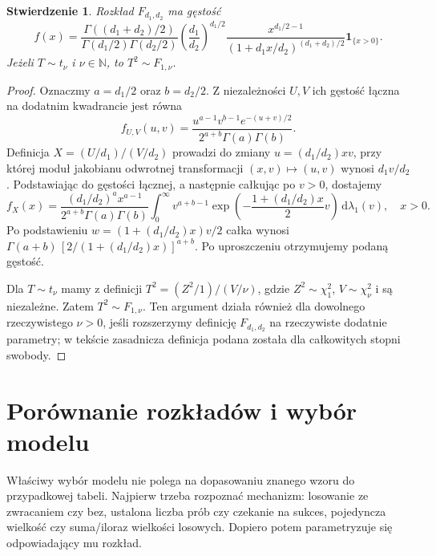 \documentclass[11pt,a4paper,oneside]{report}
\numberwithin{equation}{chapter}
\theoremstyle{plain}
\newtheorem{stwierdzenie}[twierdzenie]{Stwierdzenie}
\theoremstyle{definition}
\theoremstyle{remark}
\newcommand{\N}{\mathbb{N}}
\newcommand{\ind}[1]{\mathbf{1}_{#1}}
\newcommand{\dd}{\mathrm{d}}
\begin{document}
\begin{stwierdzenie}
Rozkład $F_{d_1,d_2}$ ma gęstość
\[
f(x)=\frac{\Gamma((d_1+d_2)/2)}
{\Gamma(d_1/2)\Gamma(d_2/2)}
\left(\frac{d_1}{d_2}\right)^{d_1/2}
\frac{x^{d_1/2-1}}{(1+d_1x/d_2)^{(d_1+d_2)/2}}
\ind{\{x>0\}}.
\]
Jeżeli $T\sim t_\nu$ i $\nu\in\N$, to $T^2\sim F_{1,\nu}$.
\end{stwierdzenie}
\begin{proof}
Oznaczmy $a=d_1/2$ oraz $b=d_2/2$.
Z niezależności $U,V$ ich gęstość łączna na dodatnim
kwadrancie jest równa
\[
f_{U,V}(u,v)=\frac{u^{a-1}v^{b-1}e^{-(u+v)/2}}
{2^{a+b}\Gamma(a)\Gamma(b)}.
\]
Definicja $X=(U/d_1)/(V/d_2)$ prowadzi do zmiany
$u=(d_1/d_2)xv$, przy której moduł jakobianu
odwrotnej transformacji $(x,v)\mapsto(u,v)$ wynosi
$d_1v/d_2$. Podstawiając do gęstości łącznej,
a następnie całkując po $v>0$, dostajemy
\[
f_X(x)=\frac{(d_1/d_2)^a x^{a-1}}
{2^{a+b}\Gamma(a)\Gamma(b)}
\int_0^\infty v^{a+b-1}
\exp\!\left(-\frac{1+(d_1/d_2)x}{2}v\right)
\,\dd\lambda_1(v),\quad x>0.
\]
Po podstawieniu $w=(1+(d_1/d_2)x)v/2$
całka wynosi
$\Gamma(a+b)\,[2/(1+(d_1/d_2)x)]^{a+b}$.
Po uproszczeniu otrzymujemy podaną gęstość.

Dla $T\sim t_\nu$ mamy z definicji
$T^2=(Z^2/1)/(V/\nu)$, gdzie
$Z^2\sim\chi_1^2$, $V\sim\chi_\nu^2$ i są niezależne.
Zatem $T^2\sim F_{1,\nu}$. Ten argument działa
również dla dowolnego rzeczywistego $\nu>0$, jeśli
rozszerzymy definicję $F_{d_1,d_2}$ na rzeczywiste
dodatnie parametry; w tekście zasadnicza definicja
podana została dla całkowitych stopni swobody.
\end{proof}

\section{Porównanie rozkładów i wybór modelu}
Właściwy wybór modelu nie polega na dopasowaniu znanego wzoru
do przypadkowej tabeli. Najpierw trzeba rozpoznać mechanizm:
losowanie ze zwracaniem czy bez, ustalona liczba prób czy czekanie
na sukces, pojedyncza wielkość czy suma/iloraz wielkości losowych.
Dopiero potem parametryzuje się odpowiadający mu rozkład.
\end{document}
